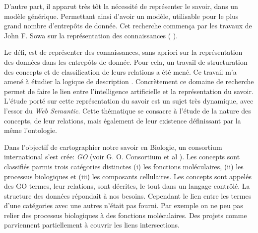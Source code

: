 \begin{refsection}

D'autre part, il apparut très tôt la nécessité de représenter le savoir, dans un modèle générique. Permettant ainsi d'avoir un modèle, utilisable pour le plus grand nombre d'entrepôts de donnée. Cet recherche  commença par les travaux de John F. Sowa sur la représentation des connaissances ( \citeyear{sowa92,sowa99}).

Le défi, est de représenter des connaissances, sans apriori sur la représentation des données dans les entrepôts de donnée. Pour cela, un travail de structuration des concepts et de classification de leurs relations a été mené. Ce travail m'a amené à étudier la logique de description \cite{baader2003description}. Concrètement ce domaine de recherche permet de faire le lien entre l'intelligence artificielle et la représentation du savoir. L'étude porté sur cette représentation du savoir est un sujet très dynamique, avec l'essor du \textit{Web Semantic}. Cette thématique se consacre à l'étude de la nature des concepts, de leur relations, mais également de leur existence définissant par la même l'ontologie.

Dans l'objectif de cartographier notre savoir en Biologie, un consortium international s'est crée: \textit{\gls{GO}} (voir G. O. Consortium
et al \citeyear{go2001,go2004}). Les concepts sont classifiés parmis trois catégories distinctes (i) les fonctions moléculaires, (ii) les processus biologiques et (iii) les composants cellulaires. Les concepts sont appelés des GO termes, leur relations, sont décrites, le tout dans un langage contrôlé. La structure des données répondait à nos besoins. Cependant le lien entre les termes d'une catégories avec une autres n'était pas fourni. Par exemple on ne peu pas relier des processus biologiques à des fonctions moléculaires. Des projets comme \cite{AdditionalGO2006} parviennent partiellement à couvrir les liens intersections.


\end{refsection}
